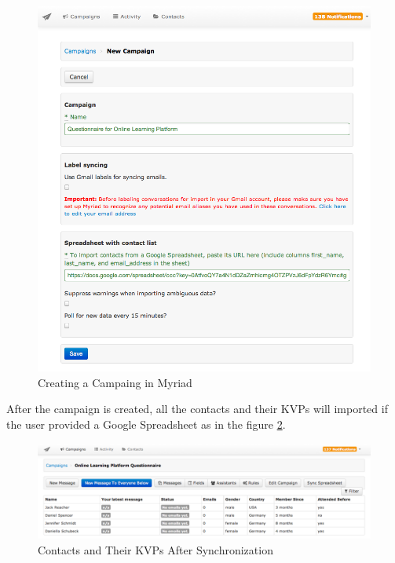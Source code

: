 \begin{figure}[htbp]
	\centering
	\includegraphics[width=1.00\textwidth]{imgs/CreateCampaign.png}
	\caption[Creating a Campaing in Myriad]{Creating a Campaing in Myriad}
	\label{fig:CreateCampaign}
\end{figure}

After the campaign is created, all the contacts and their \ac{KVP}s will imported if the user provided a Google Spreadsheet as in the figure \ref{fig:ContactListInCampaign}.

\begin{figure}[htbp]
	\centering
	\includegraphics[width=1.00\textwidth]{imgs/ContactListInCampaign.png}
	\caption[Contacts and Their \ac{KVP}s After Synchronization]{Contacts and Their \ac{KVP}s After Synchronization}
	\label{fig:ContactListInCampaign}
\end{figure}

